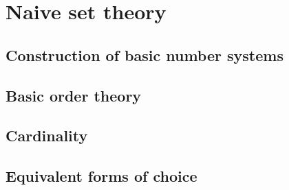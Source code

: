 
\chapter{Naive set theory}

\section{Construction of basic number systems}

\section{Basic order theory}

\section{Cardinality}

\section{Equivalent forms of choice}
